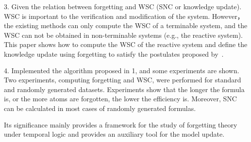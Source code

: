 \begin{englishabstract}
3. Given the relation between forgetting and WSC (SNC or knowledge update). WSC is important to the verification and modification of the system. However， the existing methods can only compute the WSC of a terminable system, and the WSC can not be obtained in non-terminable systems (e.g., the reactive system). This paper shows how to compute the WSC of the reactive system and define the knowledge update using forgetting to satisfy the postulates proposed by~\citeauthor{katsuno91mendelzon}.

4.  Implemented the algorithm proposed in 1, and some experiments are shown. Two experiments, computing forgetting and WSC, were performed for standard and randomly generated datasets. Experiments show that the longer the formula is, or the more atoms are forgotten, the lower the efficiency is. Moreover, SNC can be calculated in most cases of randomly generated formulas.

Its significance mainly provides a framework for the study of forgetting theory under temporal logic and provides an auxiliary tool for the model update.





\end{englishabstract}
